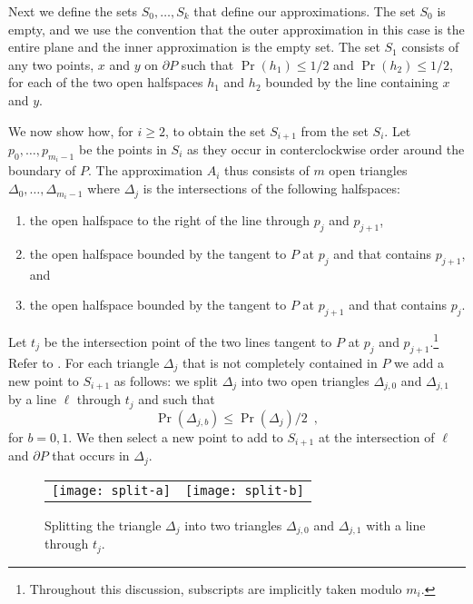 \documentclass[charterfonts,lotsofwhite]{patmorin}
\newcommand{\boundary}{\partial}
\begin{document}
Next we define the sets $S_0,\ldots,S_k$ that define our
approximations.  The set $S_0$ is empty, and we use the convention
that the outer approximation in this case is the entire plane and the
inner approximation is the empty set. The set $S_1$ consists of any two
points, $x$ and $y$ on $\boundary P$ such that $\Pr(h_1)\le 1/2$ and
$\Pr(h_2)\le 1/2$, for each of the two open halfspaces $h_1$ and $h_2$
bounded by the line containing $x$ and $y$.

We now show how, for $i\ge 2$, to obtain the set $S_{i+1}$ from the
set $S_{i}$.  Let $p_0,\ldots,p_{m_i-1}$ be the points in $S_i$ as
they occur in conterclockwise order around the boundary of $P$.  The
approximation $A_i$ thus consists of $m$ open triangles
$\Delta_0,\ldots,\Delta_{m_i-1}$ where $\Delta_j$ is the intersections
of the following halfspaces:

\begin{enumerate}
\item the open halfspace to the right of the line through $p_j$ and $p_{j+1}$,
\item the open halfspace bounded by the tangent to $P$ at $p_j$ and that
contains $p_{j+1}$, and 
\item the open halfspace bounded by the tangent to $P$ at $p_{j+1}$ and
that contains $p_j$.
\end{enumerate}
Let $t_j$ be the intersection point of 
the two lines tangent to $P$ at $p_j$ and
$p_{j+1}$.\footnote{Throughout this discussion, subscripts are
implicitly taken modulo $m_i$.}  Refer to . For each
triangle $\Delta_j$ that is not completely contained in $P$
we add a new point to
$S_{i+1}$ as follows:  we split $\Delta_j$ into two open triangles
$\Delta_{j,0}$ and $\Delta_{j,1}$ by a line $\ell$ through $t_j$ and
such that 
\[  
     \Pr(\Delta_{j,b}) \le \Pr(\Delta_{j})/2 \enspace ,
\]
for $b=0,1$.
We then select a new point to add to $S_{i+1}$ at the intersection of
$\ell$ and $\boundary P$ that occurs in $\Delta_j$.

\begin{figure}
\begin{center}
\begin{tabular}{cc}
\texttt{[image: split-a]} & \texttt{[image: split-b]}
\end{tabular}
\end{center}
\caption{Splitting the triangle $\Delta_j$ into two triangles
$\Delta_{j,0}$ and $\Delta_{j,1}$ with a line through $t_j$.}
\end{figure}
\end{document}
